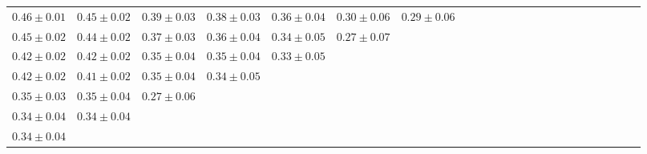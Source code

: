 \begin{table}[ht]
{{\begin{adjustbox}{width=\textwidth}
\begin{tabular}{ccccccccccccccccccccccc}
$0.46 \pm 0.01$ & $0.45 \pm 0.02$ & $0.39 \pm 0.03$ & $0.38 \pm 0.03$ & $0.36 \pm 0.04$ & $0.30 \pm 0.06$ & $0.29 \pm 0.06$ &  &  &  &  &  &  &  &  &  &  &  &  &  &  &  &  \\
$0.45 \pm 0.02$ & $0.44 \pm 0.02$ & $0.37 \pm 0.03$ & $0.36 \pm 0.04$ & $0.34 \pm 0.05$ & $0.27 \pm 0.07$ &  &  &  &  &  &  &  &  &  &  &  &  &  &  &  &  &  \\
$0.42 \pm 0.02$ & $0.42 \pm 0.02$ & $0.35 \pm 0.04$ & $0.35 \pm 0.04$ & $0.33 \pm 0.05$ &  &  &  &  &  &  &  &  &  &  &  &  &  &  &  &  &  &  \\
$0.42 \pm 0.02$ & $0.41 \pm 0.02$ & $0.35 \pm 0.04$ & $0.34 \pm 0.05$ &  &  &  &  &  &  &  &  &  &  &  &  &  &  &  &  &  &  &  \\
$0.35 \pm 0.03$ & $0.35 \pm 0.04$ & $0.27 \pm 0.06$ &  &  &  &  &  &  &  &  &  &  &  &  &  &  &  &  &  &  &  &  \\
$0.34 \pm 0.04$ & $0.34 \pm 0.04$ &  &  &  &  &  &  &  &  &  &  &  &  &  &  &  &  &  &  &  &  &  \\
$0.34 \pm 0.04$ &  &  &  &  &  &  &  &  &  &  &  &  &  &  &  &  &  &  &  &  &  &  \\

\end{tabular}
\end{adjustbox}
}
}

\end{table}
